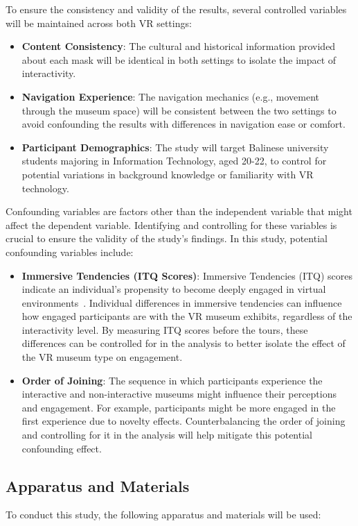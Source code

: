 \documentclass[conference]{IEEEtran}
\begin{document}
To ensure the consistency and validity of the results, several controlled variables will be maintained across both VR settings:

\begin{itemize}
    \item \textbf{Content Consistency}: The cultural and historical information provided about each mask will be identical in both settings to isolate the impact of interactivity.
    \item \textbf{Navigation Experience}: The navigation mechanics (e.g., movement through the museum space) will be consistent between the two settings to avoid confounding the results with differences in navigation ease or comfort.
    \item \textbf{Participant Demographics}: The study will target Balinese university students majoring in Information Technology, aged 20-22, to control for potential variations in background knowledge or familiarity with VR technology.
\end{itemize}

Confounding variables are factors other than the independent variable that might affect the dependent variable. Identifying and controlling for these variables is crucial to ensure the validity of the study's findings. In this study, potential confounding variables include:

\begin{itemize}
    \item \textbf{Immersive Tendencies (ITQ Scores)}: Immersive Tendencies (ITQ) scores indicate an individual's propensity to become deeply engaged in virtual environments~\cite{rozsa2022measuring}. Individual differences in immersive tendencies can influence how engaged participants are with the VR museum exhibits, regardless of the interactivity level. By measuring ITQ scores before the tours, these differences can be controlled for in the analysis to better isolate the effect of the VR museum type on engagement.
    \item \textbf{Order of Joining}: The sequence in which participants experience the interactive and non-interactive museums might influence their perceptions and engagement. For example, participants might be more engaged in the first experience due to novelty effects. Counterbalancing the order of joining and controlling for it in the analysis will help mitigate this potential confounding effect.
\end{itemize}
\subsection{Apparatus and Materials}
To conduct this study, the following apparatus and materials will be used:
\end{document}
